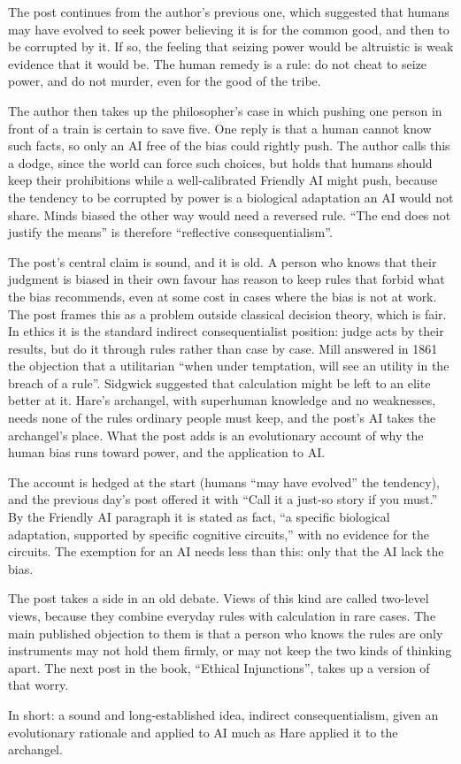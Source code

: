 \begin{afterword}
\summaryhead

The post continues from the author's previous one, which suggested that humans may have evolved to seek power believing it is for the common good, and then to be corrupted by it. If so, the feeling that seizing power would be altruistic is weak evidence that it would be. The human remedy is a rule: do not cheat to seize power, and do not murder, even for the good of the tribe.

The author then takes up the philosopher's case in which pushing one person in front of a train is certain to save five. One reply is that a human cannot know such facts, so only an AI free of the bias could rightly push. The author calls this a dodge, since the world can force such choices, but holds that humans should keep their prohibitions while a well-calibrated Friendly AI might push, because the tendency to be corrupted by power is a biological adaptation an AI would not share. Minds biased the other way would need a reversed rule. ``The end does not justify the means'' is therefore ``reflective consequentialism''.

\responsehead

The post's central claim is sound, and it is old. A person who knows that their judgment is biased in their own favour has reason to keep rules that forbid what the bias recommends, even at some cost in cases where the bias is not at work. The post frames this as a problem outside classical decision theory, which is fair. In ethics it is the standard indirect consequentialist position: judge acts by their results, but do it through rules rather than case by case. Mill answered in 1861 the objection that a utilitarian ``when under temptation, will see an utility in the breach of a rule''. Sidgwick suggested that calculation might be left to an elite better at it. Hare's archangel, with superhuman knowledge and no weaknesses, needs none of the rules ordinary people must keep, and the post's AI takes the archangel's place. What the post adds is an evolutionary account of why the human bias runs toward power, and the application to AI.

The account is hedged at the start (humans ``may have evolved'' the tendency), and the previous day's post offered it with ``Call it a just-so story if you must.'' By the Friendly AI paragraph it is stated as fact, ``a specific biological adaptation, supported by specific cognitive circuits,'' with no evidence for the circuits. The exemption for an AI needs less than this: only that the AI lack the bias.

The post takes a side in an old debate. Views of this kind are called two-level views, because they combine everyday rules with calculation in rare cases. The main published objection to them is that a person who knows the rules are only instruments may not hold them firmly, or may not keep the two kinds of thinking apart. The next post in the book, ``Ethical Injunctions'', takes up a version of that worry.

In short: a sound and long-established idea, indirect consequentialism, given an evolutionary rationale and applied to AI much as Hare applied it to the archangel.
\end{afterword}
